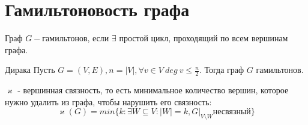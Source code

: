 \section{Гамильтоновость графа}
\begin{definition}
    Граф \(G - \)гамильтонов, если \(\exists\) простой цикл, проходящий по всем вершинам графа.
\end{definition}

\begin{theorem}{Дирака}
    Пусть \(G = (V, E), n = |V|, \forall v \in V \ deg \  v \le \frac{n}{2}\). Тогда граф \(G\) гамильтонов.
\end{theorem}

\begin{definition}
    \(\varkappa\) - вершинная связность, то есть минимальное количество вершин, которое нужно удалить из графа, чтобы нарушить его связность:
    \[\varkappa(G) = min \{k : \exists W \subseteq V: |W| = k, G |_{V 
    \setminus W} \text{несвязный}\}\]
\end{definition}


